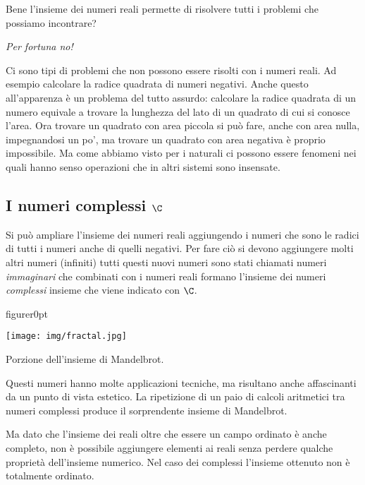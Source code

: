 Bene l'insieme dei numeri reali permette di risolvere tutti i problemi che 
possiamo incontrare? 

\begin{center} \emph{Per fortuna no!} \end{center} 

Ci sono tipi di problemi che non possono essere risolti con i numeri reali.
Ad esempio calcolare la radice quadrata di numeri negativi. Anche questo 
all'apparenza è un problema del tutto assurdo: calcolare la radice quadrata di 
un numero equivale a trovare la lunghezza del lato di un quadrato di cui si 
conosce l'area. Ora trovare un quadrato con area piccola si può fare, anche con 
area nulla, impegnandosi un po', ma trovare un quadrato con area negativa 
è proprio impossibile. Ma come abbiamo visto per i naturali ci possono essere 
fenomeni nei quali hanno senso operazioni che in altri sistemi sono insensate.

\subsection{I numeri complessi $\C$}
\label{subsec:insnum_complessi}

Si può ampliare l'insieme dei numeri reali aggiungendo i numeri che sono le 
radici di tutti i numeri anche di quelli negativi. Per fare ciò si devono 
aggiungere molti altri numeri (infiniti) tutti questi nuovi numeri sono stati 
chiamati numeri \emph{immaginari} che combinati con i numeri reali formano 
l'insieme dei numeri \emph{complessi} insieme che viene indicato con $\C$.

\begin{wrapfloat}{figure}{r}{0pt}
\begin{inaccessibleblock}
\texttt{[image: img/fractal.jpg]}
\end{inaccessibleblock}
\caption{Porzione dell'insieme di Mandelbrot.}
\label{fig:mandelbrot}
\end{wrapfloat}

Questi numeri hanno molte applicazioni tecniche, ma risultano anche 
affascinanti da un punto di vista estetico. La ripetizione di un paio di 
calcoli aritmetici tra numeri complessi produce il sorprendente insieme di 
Mandelbrot.

Ma dato che l'insieme dei reali oltre che essere un campo ordinato è anche 
completo, non è possibile aggiungere elementi ai reali senza perdere qualche 
proprietà dell'insieme numerico. Nel caso dei complessi l'insieme ottenuto non 
è totalmente ordinato.

